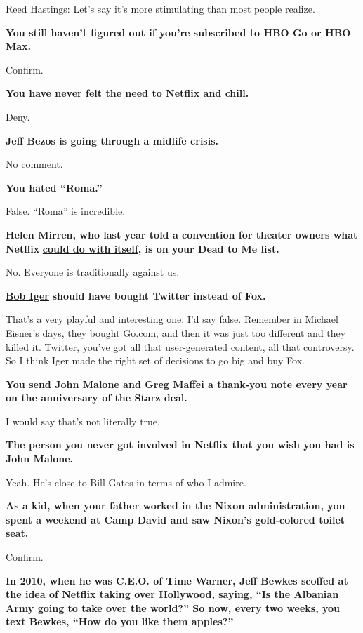 Reed Hastings: Let's say it's more stimulating than most people realize.

\textbf{You still haven't figured out if you're subscribed to HBO Go or
HBO Max.}

Confirm.

\textbf{You have never felt the need to Netflix and chill.}

Deny.

\textbf{Jeff Bezos is going through a midlife crisis.}

No comment.

\textbf{You hated ``Roma.''}

False. ``Roma'' is incredible.

\textbf{Helen Mirren, who last year told a convention for theater owners
what Netflix}
\textbf{\href{https://www.hollywoodreporter.com/news/helen-mirren-says-f-netflix-thanks-theater-owners-at-cinemacon-1199086\#:~:text=Helen\%20Mirren\%20on\%20Tuesday\%20gave,owners\%20gathered\%20in\%20Las\%20Vegas.}{could
do with itself}, is on your Dead to Me list.}

No. Everyone is traditionally against us.

\textbf{\href{https://www.nytimes3xbfgragh.onion/2019/09/22/style/disney-bob-iger-book.html}{Bob
Iger}} \textbf{should have bought Twitter instead of Fox.}

That's a very playful and interesting one. I'd say false. Remember in
Michael Eisner's days, they bought Go.com, and then it was just too
different and they killed it. Twitter, you've got all that
user-generated content, all that controversy. So I think Iger made the
right set of decisions to go big and buy Fox.

\textbf{You send John Malone and Greg Maffei a thank-you note every year
on the anniversary of the Starz deal.}

I would say that's not literally true.

\textbf{The person you never got involved in Netflix that you wish you
had is John Malone.}

Yeah. He's close to Bill Gates in terms of who I admire.

\textbf{As a kid, when your father worked in the Nixon administration,
you spent a weekend at Camp David and saw Nixon's gold-colored toilet
seat.}

Confirm.

\textbf{In 2010, when he was C.E.O. of Time Warner, Jeff Bewkes scoffed
at the idea of Netflix taking over Hollywood, saying, ``Is the Albanian
Army going to take over the world?'' So now, every two weeks, you text
Bewkes, ``How do you like them apples?''}

